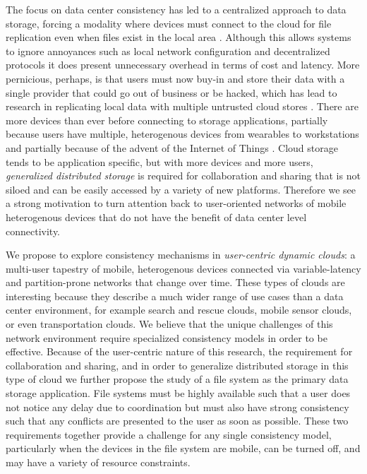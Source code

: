 \documentclass{article}
\newcommand{\pjk}[1]{{\bf
    [\marginpar[\hbox{{\textcolor{blue}{pjk}}\raisebox{0ex}{\Huge $\rightarrow$}}]%
{\hbox{\raisebox{0ex}{\Huge $\leftarrow$}{\textcolor{blue}{pjk}}}}\textcolor{blue}{#1}]}}
\renewcommand{\pjk}[1]{\textcolor{blue}{[#1]}}
\begin{document}
The focus on data center consistency has led to a centralized approach to data storage, forcing a modality where devices must connect to the cloud for file replication even when files exist in the local area \cite{drago_inside_2012}. Although this allows systems to ignore annoyances such as local network configuration and decentralized protocols it does present unnecessary overhead in terms of cost and latency. More pernicious, perhaps, is that users must now buy-in and store their data with a single provider that could go out of business or be hacked, which has lead to research in replicating local data with multiple untrusted cloud stores \cite{zhang_viewbox:_2014,feldman_sporc:_2010}. There are more devices than ever before connecting to storage applications, partially because users have multiple, heterogenous devices from wearables to workstations and partially because of the advent of the Internet of Things \cite{miorandi_internet_2012}. Cloud storage tends to be application specific, but with more devices and more users, \textit{generalized distributed storage} is required for collaboration and sharing that is not siloed and can be easily accessed by a variety of new platforms. Therefore we see a strong motivation to turn attention back to user-oriented networks of mobile heterogenous devices that do not have the benefit of data center level connectivity.

We propose to explore consistency mechanisms in \textit{user-centric dynamic clouds}: a multi-user tapestry of mobile, heterogenous devices connected via variable-latency and partition-prone networks that change over time. These types of clouds are interesting because they describe a much wider range of use cases than a data center environment, for example search and rescue clouds, mobile sensor clouds, or even transportation clouds. We believe that the unique challenges of this network environment require specialized consistency models in order to be effective. Because of the user-centric nature of this research, the requirement for collaboration and sharing, and in order to generalize distributed storage in this type of cloud we further propose the study of a file system as the primary data storage application. File systems must be highly available such that a user does not notice any delay due to coordination but must also have strong consistency such that any conflicts are presented to the user as soon as possible. These two requirements together provide a challenge for any single consistency model, particularly when the devices in the file system are mobile, can be turned off, and may have a variety of resource constraints.
\end{document}
